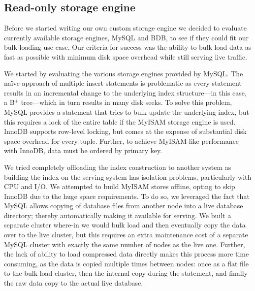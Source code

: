 
\subsection{Read-only storage engine}
\label{sec:read_only}

Before we started writing our own custom storage engine we decided to
evaluate currently available storage engines, MySQL and BDB, to see 
if they could fit our bulk loading use-case. Our criteria for success 
was the ability to bulk load data as fast as possible with minimum 
disk space overhead while still serving live traffic.
 
We started by evaluating the various storage engines provided by
MySQL. The na\"ive approach of multiple insert statements is
problematic as every statement results in an incremental change to the
underlying index structure---in this case, a B$^{+}$ tree---which in
turn results in many disk seeks. To solve this problem, MySQL provides
a  statement that tries to bulk update the underlying
index, but this requires a lock of the entire table if the MyISAM
storage engine is used. InnoDB supports row-level locking, but comes
at the expense of substantial disk space overhead for every tuple.
Further, to achieve MyISAM-like performance with InnoDB, data must be
ordered by primary key.

We tried completely offloading the index construction to another
system as building the index on the serving system has isolation
problems, particularly with CPU and I/O. We attempted to build MyISAM
stores offline, opting to skip InnoDB due to the huge space
requirements. To do so, we leveraged the fact that MySQL allows
copying of database files from another node into a live database
directory; thereby automatically making it available for serving. We built a
separate cluster where-in we would bulk load and then eventually copy
the data over to the live cluster, but this requires an extra
maintenance cost of a separate MySQL cluster with exactly the same
number of nodes as the live one. Further, the lack of ability to load
compressed data directly makes this process more time consuming, as
the data is copied multiple times between nodes: once as a flat file
to the bulk load cluster, then the internal copy during the 
statement, and finally the raw data copy to the actual live database. 


